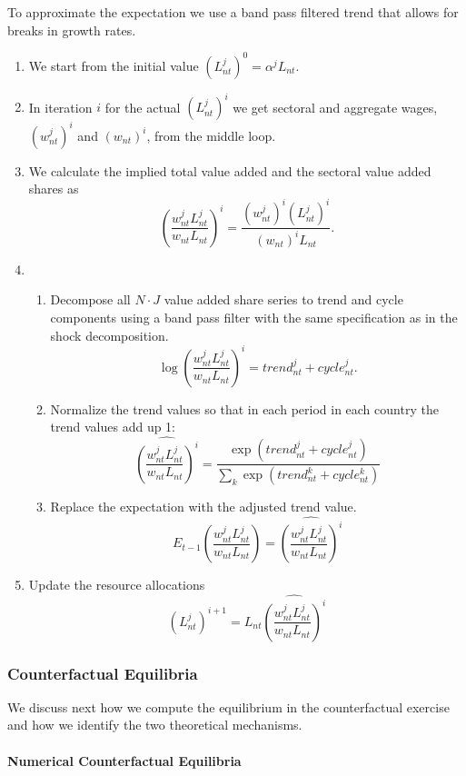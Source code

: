 \documentclass[12pt]{article}
\begin{document}
To approximate the expectation we use a band pass filtered trend that allows for breaks in growth rates.

\begin{enumerate}
  \item We start from the initial value $(L_{nt}^j)^0 = \alpha^j L_{nt}$.
  \item In iteration $i$ for the actual $(L_{nt}^j)^i$ we get sectoral and aggregate wages, $(w_{nt}^j)^i$ and $(w_{nt})^i$, from the middle loop.
  \item We calculate the implied total value added and the sectoral value added shares as
    $$\left(\frac{w_{nt}^j L_{nt}^j}{w_{nt} L_{nt}}\right)^i = \frac{(w_{nt}^j)^i (L_{nt}^j)^i}{(w_{nt})^i L_{nt}}.$$
  \item
    \begin{enumerate}
      \item Decompose all $N \cdot J$ value added share series to trend and cycle components using a band pass filter with the same specification as in the shock decomposition.
        $$\log\left(\frac{w_{nt}^j L_{nt}^j}{w_{nt} L_{nt}}\right)^i = trend^j_{nt} + cycle_{nt}^j.$$
      \item Normalize the trend values so that in each period in each country the trend values add up 1:
        $$\widehat{\left(\frac{w_{nt}^j L_{nt}^j}{w_{nt} L_{nt}}\right)^i} = \frac{\exp(trend^j_{nt} + cycle_{nt}^j)}{\sum_k \exp(trend^k_{nt} + cycle_{nt}^k)}$$
      \item Replace the expectation with the adjusted trend value.
      $$E_{t - 1} \left( \frac{w_{nt}^j L_{nt}^j}{w_{nt} L_{nt}}\right) = \widehat{\left(\frac{w_{nt}^j L_{nt}^j}{w_{nt} L_{nt}}\right)^i}$$
    \end{enumerate} 
  \item Update the resource allocations
    $$(L_{nt}^j)^{i + 1} = L_{nt} \widehat{\left(\frac{w_{nt}^j L_{nt}^j}{w_{nt} L_{nt}}\right)^i}$$
\end{enumerate}

\subsubsection{Counterfactual Equilibria}

We discuss next how we compute the equilibrium in the counterfactual
exercise and how we identify the two theoretical mechanisms.

\paragraph{Numerical Counterfactual Equilibria}
\end{document}
